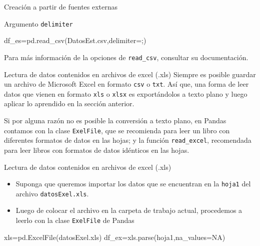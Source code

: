 \documentclass[
  ignorenonframetext,
  aspectratio=169,
  spanish,
]{beamer}
\newenvironment{Shaded}{\begin{snugshade}}{\end{snugshade}}
\newcommand{\NormalTok}[1]{\textcolor[rgb]{0.00,0.23,0.31}{#1}}
\newcommand{\OperatorTok}[1]{\textcolor[rgb]{0.37,0.37,0.37}{#1}}
\newcommand{\StringTok}[1]{\textcolor[rgb]{0.13,0.47,0.30}{#1}}
\begin{document}
\begin{frame}[fragile]{Creación a partir de fuentes externas}
\begin{block}{Argumento \texttt{delimiter}}
\begin{Shaded}
\begin{Highlighting}[]
\NormalTok{df\_es}\OperatorTok{=}\NormalTok{pd.read\_csv(}\StringTok{\textquotesingle{}DatosEst.csv\textquotesingle{}}\NormalTok{,delimiter}\OperatorTok{=}\StringTok{\textquotesingle{};\textquotesingle{}}\NormalTok{)}
\end{Highlighting}
\end{Shaded}

Para más información de la opciones de \texttt{read\_csv}, consultar su
documentación.
\end{block}

\begin{block}{Lectura de datos contenidos en archivos de excel (.xls)}
\label{lectura-de-datos-contenidos-en-archivos-de-excel-.xls}
Siempre es posible guardar un archivo de Microsoft Excel en formato
\texttt{csv} o \texttt{txt}. Así que, una forma de leer datos que vienen
en formato \texttt{xls} o \texttt{xlsx} es exportándolos a texto plano y
luego aplicar lo aprendido en la sección anterior.

Si por alguna razón no es posible la conversión a texto plano, en Pandas
contamos con la clase \texttt{ExelFile}, que se recomienda para leer un
libro con diferentes formatos de datos en las hojas; y la función
\texttt{read\_excel}, recomendada para leer libros con formatos de datos
idénticos en las hojas.
\end{block}

\begin{block}{Lectura de datos contenidos en archivos de excel (.xls)}
\label{lectura-de-datos-contenidos-en-archivos-de-excel-.xls-1}
\begin{itemize}
\item
  Suponga que queremos importar los datos que se encuentran en la
  \texttt{hoja1} del archivo \texttt{datosExel.xls}.
\item
  Luego de colocar el archivo en la carpeta de trabajo actual,
  procedemos a leerlo con la clase \texttt{ExelFile} de Pandas
\end{itemize}

\begin{Shaded}
\begin{Highlighting}[]
\NormalTok{xls}\OperatorTok{=}\NormalTok{pd.ExcelFile(}\StringTok{\textquotesingle{}datosExel.xls\textquotesingle{}}\NormalTok{)}
\NormalTok{df\_ex}\OperatorTok{=}\NormalTok{xls.parse(}\StringTok{\textquotesingle{}hoja1\textquotesingle{}}\NormalTok{,na\_values}\OperatorTok{=}\StringTok{\textquotesingle{}NA\textquotesingle{}}\NormalTok{)}
\end{Highlighting}
\end{Shaded}
\end{block}


\end{frame}
\end{document}
